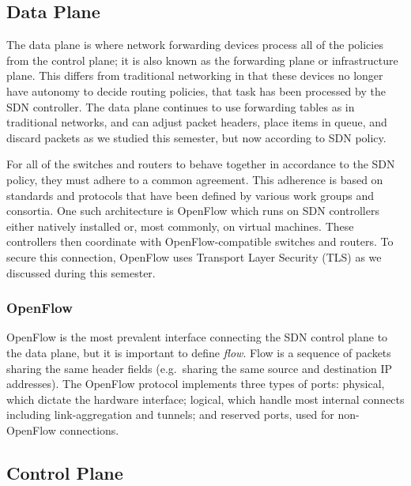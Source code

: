 \documentclass[11pt]{article}
\begin{document}
\subsection{Data Plane}

The data plane is where network forwarding devices process all of the policies from the control plane; it is also known as the forwarding plane or infrastructure plane. This differs from traditional networking in that these devices no longer have autonomy to decide routing policies, that task has been processed by the SDN controller. The data plane continues to use forwarding tables as in traditional networks, and can adjust packet headers, place items in queue, and discard packets as we studied this semester, but now according to SDN policy.

For all of the switches and routers to behave together in accordance to the SDN policy, they must adhere to a common agreement. This adherence is based on standards and protocols that have been defined by various work groups and consortia. One such architecture is OpenFlow which runs on SDN controllers either natively installed or, most commonly, on virtual machines. These controllers then coordinate with OpenFlow-compatible switches and routers. To secure this connection, OpenFlow uses Transport Layer Security (TLS) as we discussed during this semester.

\subsubsection{OpenFlow}

OpenFlow is the most prevalent interface connecting the SDN control plane to the data plane, but it is important to define \textit{flow}. Flow is a sequence of packets \cite{Stallings} sharing the same header fields (e.g.~sharing the same source and destination IP addresses). The OpenFlow protocol implements three types of ports: physical, which dictate the hardware interface; logical, which handle most internal connects including link-aggregation and tunnels; and reserved ports, used for non-OpenFlow connections.

\subsection{Control Plane}
\end{document}
